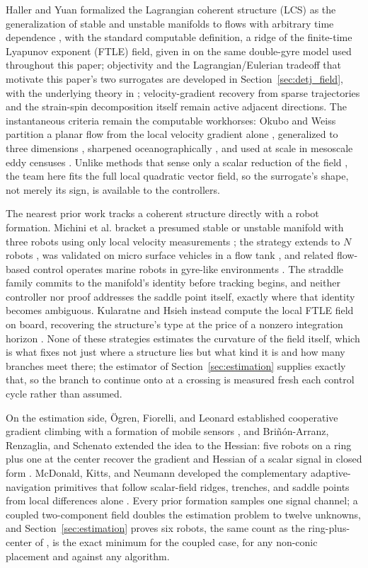 \documentclass[lettersize,journal]{IEEEtran}
\begin{document}
Haller and Yuan formalized the Lagrangian coherent structure (LCS) as
the generalization of stable and unstable manifolds to flows with
arbitrary time dependence \cite{6}, with the standard computable
definition, a ridge of the finite-time Lyapunov exponent (FTLE) field,
given in \cite{8} on the same double-gyre model used throughout this
paper; objectivity and the Lagrangian/Eulerian tradeoff that motivate
this paper's two surrogates are developed in
Section~\ref{sec:detj_field}, with the underlying theory in
\cite{16,17,18}; velocity-gradient recovery from sparse trajectories
\cite{19} and the strain-spin decomposition itself \cite{20} remain
active adjacent directions. The instantaneous criteria remain the
computable workhorses: Okubo and Weiss partition a planar flow from the
local velocity gradient alone \cite{21,22}, generalized to three
dimensions \cite{23}, sharpened oceanographically \cite{24}, and used
at scale in mesoscale eddy censuses \cite{5}. Unlike methods that sense
only a scalar reduction of the field \cite{25}, the team here fits the
full local quadratic vector field, so the surrogate's shape, not merely
its sign, is available to the controllers.

The nearest prior work tracks a coherent structure directly with a
robot formation. Michini et al. bracket a presumed stable or unstable
manifold with three robots using only local velocity measurements
\cite{9}; the strategy extends to $N$ robots \cite{10}, was validated
on micro surface vehicles in a flow tank \cite{11}, and related
flow-based control operates marine robots in gyre-like environments
\cite{12}. The straddle family commits to the manifold's identity
before tracking begins, and neither controller nor proof addresses the
saddle point itself, exactly where that identity becomes ambiguous.
Kularatne and Hsieh instead compute the local FTLE field on board,
recovering the structure's type at the price of a nonzero integration
horizon \cite{13}. None of these strategies estimates the curvature of
the field itself, which is what fixes not just where a structure lies
but what kind it is and how many branches meet there; the estimator of
Section~\ref{sec:estimation} supplies exactly that, so the branch to
continue onto at a crossing is measured fresh each control cycle rather
than assumed.

On the estimation side, \"{O}gren, Fiorelli, and Leonard established
cooperative gradient climbing with a formation of mobile sensors
\cite{26}, and Bri\~{n}\'{o}n-Arranz, Renzaglia, and Schenato extended
the idea to the Hessian: five robots on a ring plus one at the center
recover the gradient and Hessian of a scalar signal in closed form
\cite{15}. McDonald, Kitts, and Neumann developed the complementary
adaptive-navigation primitives that follow scalar-field ridges,
trenches, and saddle points from local differences alone
\cite{27,28,29}. Every prior formation samples one signal channel; a
coupled two-component field doubles the estimation problem to twelve
unknowns, and Section~\ref{sec:estimation} proves six robots, the same
count as the ring-plus-center of \cite{15}, is the exact minimum for
the coupled case, for any non-conic placement and against any
algorithm.
\end{document}
